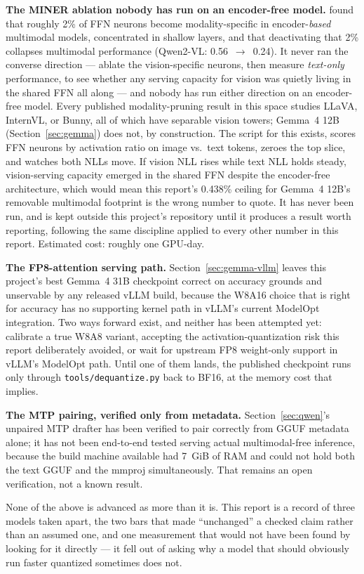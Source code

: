 \documentclass[11pt]{article}
\begin{document}
\textbf{The MINER ablation nobody has run on an encoder-free model.}
\citet{miner2024} found that roughly 2\% of FFN neurons become modality-specific in
encoder-\emph{based} multimodal models, concentrated in shallow layers, and that
deactivating that 2\% collapses multimodal performance (Qwen2-VL: 0.56~$\to$~0.24). It
never ran the converse direction --- ablate the vision-specific neurons, then measure
\emph{text-only} performance, to see whether any serving capacity for vision was
quietly living in the shared FFN all along --- and nobody has run either direction on an
encoder-free model. Every published modality-pruning result in this space studies
LLaVA, InternVL, or Bunny, all of which have separable vision towers; Gemma~4 12B
(Section~\ref{sec:gemma}) does not, by construction. The script for this exists, scores
FFN neurons by activation ratio on image vs.\ text tokens, zeroes the top slice, and
watches both NLLs move. If vision NLL rises while text NLL holds steady, vision-serving
capacity emerged in the shared FFN despite the encoder-free architecture, which would
mean this report's 0.438\% ceiling for Gemma~4 12B's removable multimodal footprint is
the wrong number to quote. It has never been run, and is kept outside this project's
repository until it produces a result worth reporting, following the same discipline
applied to every other number in this report. Estimated cost: roughly one GPU-day.

\textbf{The FP8-attention serving path.} Section~\ref{sec:gemma-vllm} leaves this
project's best Gemma~4 31B checkpoint correct on accuracy grounds and unservable by any
released vLLM build, because the W8A16 choice that is right for accuracy has no
supporting kernel path in vLLM's current ModelOpt integration. Two ways forward exist,
and neither has been attempted yet: calibrate a true W8A8 variant, accepting the
activation-quantization risk this report deliberately avoided, or wait for upstream FP8
weight-only support in vLLM's ModelOpt path. Until one of them lands, the published
checkpoint runs only through \texttt{tools/dequantize.py} back to BF16, at the memory
cost that implies.

\textbf{The MTP pairing, verified only from metadata.} Section~\ref{sec:qwen}'s
unpaired MTP drafter has been verified to pair correctly from GGUF metadata alone; it
has not been end-to-end tested serving actual multimodal-free inference, because the
build machine available had 7~GiB of RAM and could not hold both the text GGUF and the
mmproj simultaneously. That remains an open verification, not a known result.

None of the above is advanced as more than it is. This report is a record of three
models taken apart, the two bars that made ``unchanged'' a checked claim rather than an
assumed one, and one measurement that would not have been found by looking for it
directly --- it fell out of asking why a model that should obviously run faster
quantized sometimes does not.



\end{document}
